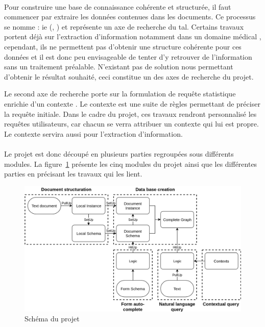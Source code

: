\paragraph{}
Pour construire une base de connaissance cohérente et structurée, il faut commencer par extraire les données contenues dans les documents.
Ce processus se nomme : \gls{ie} (\cite{grishman_information_1997}, \cite{cowie_information_2000}) et représente un axe de recherche du \gls{tal}.
Certains travaux portent déjà sur l'extraction d'information notamment dans un domaine médical \cite{polepalli_ramesh_automatically_2014}, cependant, ils ne permettent pas d'obtenir une structure cohérente pour ces données et il est donc peu envisageable de tenter d'y retrouver de l'information sans un traitement préalable.
N'existant pas de solution nous permettant d'obtenir le résultat souhaité, ceci constitue un des axes de recherche du projet.

Le second axe de recherche porte sur la formulation de requête statistique enrichie d'un contexte \cite{chabin_context-driven_2018}.
Le contexte est une suite de règles permettant de préciser la requête initiale.
Dans le cadre du projet, ces travaux rendront personnalisé les requêtes utilisateurs, car chacun se verra attribuer un contexte qui lui est propre.
Le contexte servira aussi pour l'extraction d'information.

\paragraph{}
Le projet est donc découpé en plusieurs parties regroupées sous différents modules.
La figure~\ref{fig:sch_projet} présente les cinq modules du projet ainsi que les différentes parties en précisant les travaux qui les lient.

\begin{figure}[htb]
    \centering
    \includegraphics[width=\linewidth]{these/images/global_project.png}
    \caption{Schéma du projet}
    \label{fig:sch_projet}
\end{figure}

